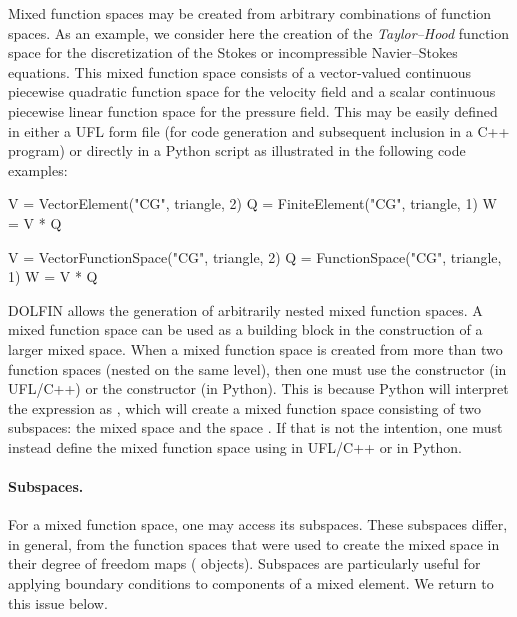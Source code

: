 Mixed function spaces may be created from arbitrary combinations of
function spaces. As an example, we consider here the creation of the
\emph{Taylor--Hood} function space for the discretization of the Stokes
or incompressible Navier--Stokes equations. This mixed function space
consists of a vector-valued continuous piecewise quadratic function space
for the velocity field and a scalar continuous piecewise linear function
space for the pressure field. This may be easily defined in either a
UFL form file (for code generation and subsequent inclusion in a C++
program) or directly in a Python script as illustrated in the following
code examples:
\begin{uflcode}
V = VectorElement("CG", triangle, 2)
Q = FiniteElement("CG", triangle, 1)
W = V * Q
\end{uflcode}
\begin{python}
V = VectorFunctionSpace("CG", triangle, 2)
Q = FunctionSpace("CG", triangle, 1)
W = V * Q
\end{python}

DOLFIN allows the generation of arbitrarily nested mixed function
spaces. A mixed function space can be used as a building block in the
construction of a larger mixed space. When a mixed function space is
created from more than two function spaces (nested on the same level),
then one must use the  constructor (in UFL/C++) or
the  constructor (in Python). This is because
Python will interpret the expression  as , which will create a mixed function space consisting of two
subspaces: the mixed space  and the space . If that is
not the intention, one must instead define the mixed function space using
 in UFL/C++ or  in Python.


\paragraph{Subspaces.}

For a mixed function space, one may access its subspaces. These
subspaces differ, in general, from the function spaces that were used to
create the mixed space in their degree of freedom maps (
objects). Subspaces are particularly useful for applying boundary
conditions to components of a mixed element. We return to this
issue below.

